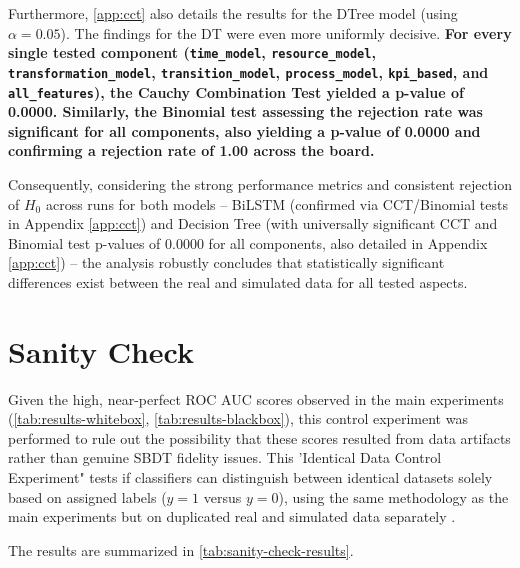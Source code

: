 Furthermore, \autoref{app:cct} also details the results for the DTree model (using $\alpha = 0.05$). The findings for the DT were even more uniformly decisive. \textbf{For every single tested component (\texttt{time\_model}, \texttt{resource\_model}, \texttt{transformation\_model}, \texttt{transition\_model}, \texttt{process\_model}, \texttt{kpi\_based}, and \texttt{all\_features}), the Cauchy Combination Test yielded a p-value of 0.0000. Similarly, the Binomial test assessing the rejection rate was significant for all components, also yielding a p-value of 0.0000 and confirming a rejection rate of 1.00 across the board.}

Consequently, considering the strong performance metrics and consistent rejection of $H_0$ across runs for both models – BiLSTM (confirmed via CCT/Binomial tests in Appendix \ref{app:cct}) and Decision Tree (with universally significant CCT and Binomial test p-values of 0.0000 for all components, also detailed in Appendix \ref{app:cct}) – the analysis robustly concludes that statistically significant differences exist between the real and simulated data for all tested aspects.



\section{Sanity Check}
\label{sec:sanity-check}

Given the high, near-perfect ROC AUC scores observed in the main experiments (\autoref{tab:results-whitebox}, \autoref{tab:results-blackbox}), this control experiment was performed to rule out the possibility that these scores resulted from data artifacts rather than genuine SBDT fidelity issues. This 'Identical Data Control Experiment" tests if classifiers can distinguish between identical datasets solely based on assigned labels ($y=1$ versus $y=0$), using the same methodology as the main experiments but on duplicated real and simulated data separately \autocite{adebayo2018sanity}.

The results are summarized in \autoref{tab:sanity-check-results}.

